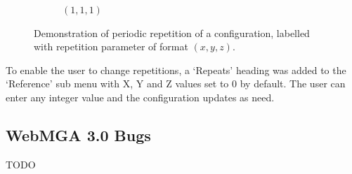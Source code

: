 \begin{figure}
\begin{center}
\begin{subfigure}{0.3\textwidth}
      \caption{$(1,1,1)$}
      \label{fig:periodic_3}
    \end{subfigure}
  \end{center}
  \caption{Demonstration of periodic repetition of a configuration, labelled with repetition parameter of format $(x, y, z)$.}
  \label{fig:periodic}
\end{figure}

To enable the user to change repetitions, a `Repeats' heading was added to the `Reference' sub menu with X, Y and Z values set to 0 by default. The user can enter any integer value and the configuration updates as need.

\subsection{WebMGA 3.0 Bugs}
TODO
